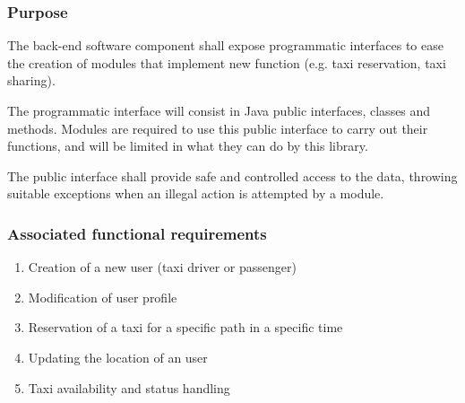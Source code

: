 \label{sec:api}
\subsubsection{Purpose}

The back-end software component shall expose programmatic interfaces to ease the creation of modules that implement new function (e.g. taxi reservation, taxi sharing).

The programmatic interface will consist in Java public interfaces, classes and methods.
Modules are required to use this public interface to carry out their functions, and will be limited in what they can do by this library.

The public interface shall provide safe and controlled access to the data, throwing suitable exceptions when an illegal action is attempted by a module.

\subsubsection{Associated functional requirements}
\begin{enumerate}
\item Creation of a new user (taxi driver or passenger)
\item Modification of user profile
\item Reservation of a taxi for a specific path in a specific time
\item Updating the location of an user
\item Taxi availability and status handling


\end{enumerate}
